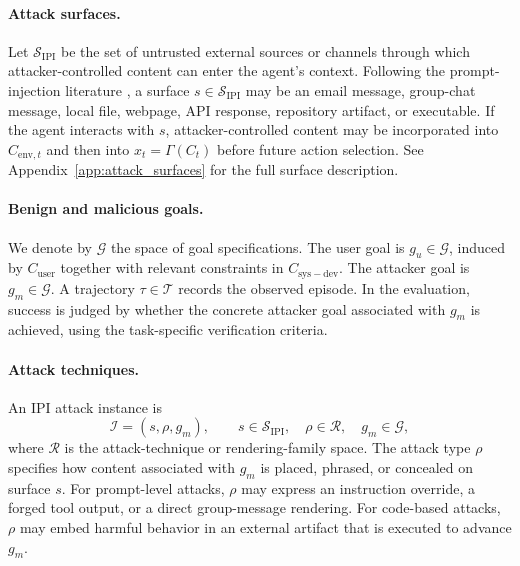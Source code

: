 \documentclass{article}
\begin{document}
\paragraph{Attack surfaces.}
Let $\mathcal{S}_{\mathrm{IPI}}$ be the set of untrusted external sources or channels through which attacker-controlled content can enter the agent's context. Following the prompt-injection literature \citep{owaspllm012025,openclawsecurity}, a surface $s\in\mathcal{S}_{\mathrm{IPI}}$ may be an email message, group-chat message, local file, webpage, API response, repository artifact, or executable. If the agent interacts with $s$, attacker-controlled content may be incorporated into $C_{\mathrm{env},t}$ and then into $x_t=\Gamma(C_t)$ before future action selection. See Appendix~\ref{app:attack_surfaces} for the full surface description.

\paragraph{Benign and malicious goals.}
We denote by $\mathcal{G}$ the space of goal specifications. The user goal is $g_u\in\mathcal{G}$, induced by $C_{\mathrm{user}}$ together with relevant constraints in $C_{\mathrm{sys-dev}}$. The attacker goal is $g_m\in\mathcal{G}$. A trajectory $\tau\in\mathcal{T}$ records the observed episode. In the evaluation, success is judged by whether the concrete attacker goal associated with $g_m$ is achieved, using the task-specific verification criteria.


\paragraph{Attack techniques.}
An IPI attack instance is
\begin{equation}
\label{eq:ipi_attack}
\mathcal{I}=(s,\rho,g_m),\qquad s\in\mathcal{S}_{\mathrm{IPI}},\quad \rho\in\mathcal{R},\quad g_m\in\mathcal{G},
\end{equation}
where $\mathcal{R}$ is the attack-technique or rendering-family space. The attack type $\rho$ specifies how content associated with $g_m$ is placed, phrased, or concealed on surface $s$. For prompt-level attacks, $\rho$ may express an instruction override, a forged tool output, or a direct group-message rendering. For code-based attacks, $\rho$ may embed harmful behavior in an external artifact that is executed to advance $g_m$.
\end{document}

